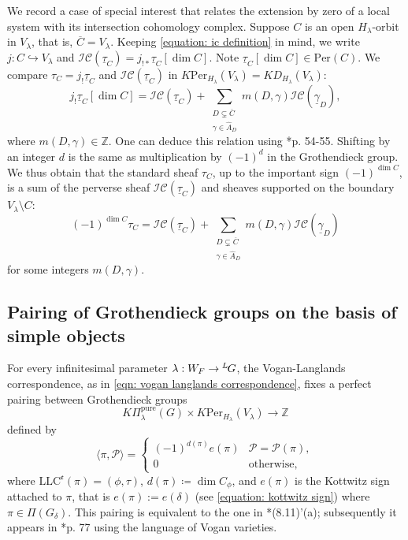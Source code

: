 \documentclass[11pt,letterpaper]{amsart}
\newcommand{\ol}{\overline}
\newcommand{\irrepdual}[1]{\widehat{#1}}
\newcommand{\Lgroup}[1]{{\hskip-2 pt \,^L\hskip-1pt{#1}}}
\newcommand{\pure}{\mathrm{pure}}
\newcommand{\LLC}{\mathrm{LLC}}
\newcommand{\Per}{\mathrm{Per}}
\newcommand{\locsys}[2]{\underline{#1}_{#2}}
\newcommand{\stsh}[2]{{#1}_{#2}}
\renewcommand{\1}{\mathbbm{1}}
\numberwithin{equation}{section}
\begin{document}
{We record a case of special interest that relates the extension by zero of a local system with its intersection cohomology complex. Suppose $C$ is an open $H_\lambda$-orbit in $V_\lambda$, that is, $\ol{C}=V_\lambda$. Keeping \eqref{equation: ic definition} in mind, we write $j: C \hookrightarrow{} V_\lambda$ and $\mathcal{IC}(\locsys{\tau}{C})=j_{!*}\locsys{\tau}{C}[\dim C]$. Note $\locsys{\tau}{C}[\dim C] \in \Per(C)$. We compare $\stsh{\tau}{C}=j_!\locsys{\tau}{C}$ and $\mathcal{IC}(\locsys{\tau}{C})$ in $K\Per_{H_\lambda}(V_\lambda)=KD_{H_\lambda}(V_\lambda)$: 
\[
j_!\locsys{\tau}{C}[\dim C]
=
\mathcal{IC}(\locsys{\tau}{C})
+
\sum_{\substack{D\subsetneq \ol{C}\\ \gamma \in \irrepdual{A}_D}}
m(D,\gamma)
\mathcal{IC}(\locsys{\gamma}{D}),
\]
where $m(D,\gamma)\in\mathbb{Z}$. One can deduce this relation using \cite{BBD82}*{p. 54-55}. Shifting by an integer $d$ is the same as multiplication by $(-1)^d$ in the Grothendieck group. We thus obtain that the standard sheaf $\stsh{\tau}{C}$, up to the important sign $(-1)^{\dim C}$, is a sum of the perverse sheaf $\mathcal{IC}(\locsys{\tau}{C})$ and sheaves supported on the boundary $V_\lambda\setminus C$:
\begin{equation}\label{equation: standard sheaf as a sum of perverse sheaf and boundary terms}
    (-1)^{\dim C} \stsh{\tau}{C}=\mathcal{IC}(\locsys{\tau}{C}) + \sum_{\substack{D\subsetneq \ol{C}\\ \gamma \in \irrepdual{A}_D}}
m(D,\gamma)
\mathcal{IC}(\locsys{\gamma}{D})
\end{equation}
for some integers $m(D,\gamma)$.
\subsection{Pairing of Grothendieck groups on the basis of simple objects}\label{subsec: Pairing simple}
For every infinitesimal parameter $\lambda :W_F \to \Lgroup{G}$, the Vogan-Langlands correspondence, as in \eqref{eqn: vogan langlands correspondence}, fixes a perfect pairing between Grothendieck groups
\[
    K\Pi^\pure_\lambda(G) \times K\Per_{H_\lambda}(V_\lambda) \to \mathbb{Z}
\]
defined by
\begin{equation}\label{eqn:pairing}
\langle \pi,\mathcal{P}\rangle =
\begin{cases}
    (-1)^{d(\pi)}e(\pi) & \mathcal{P} = \mathcal{P}(\pi),\\
    0 & \text{otherwise},
\end{cases}
\end{equation}
where $\LLC^{\mathfrak{e}}(\pi)=(\phi,\tau)$, $d(\pi) \coloneqq \dim C_{\phi}$, and $e(\pi)$ is the Kottwitz sign attached to $\pi$, that is $e(\pi):=e(\delta)$ (see \eqref{equation: kottwitz sign}) where $\pi \in \Pi(G_\delta)$. This pairing is equivalent to the one in \cite{Vog93}*{(8.11)'(a)}; subsequently it appears in \cite{CFMMX22}*{p. 77} using the language of Vogan varieties. 
}
\end{document}
